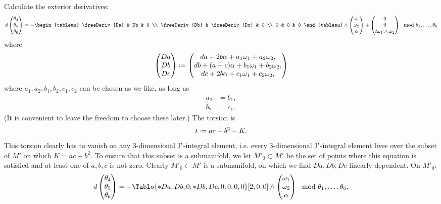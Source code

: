 Calculate the exterior derivatives:
\[
d
\begin{pmatrix}
  \theta_4 \\
  \theta_5 \\
  \theta_6 
\end{pmatrix}
=
-
\begin{tableau}
\freeDeriv{Da} & Db & 0 \\
\freeDeriv{Db} & \freeDeriv{Dc} & 0 \\
0 & 0 & 0
\end{tableau}
\wedge 
\begin{pmatrix}
  \pf_1 \\
  \pf_2 \\
  \alpha
\end{pmatrix}
+
\begin{pmatrix}
0 \\
0 \\
t \pf_1 \wedge \pf_2
\end{pmatrix}
\mod{\theta_1,\dots,\theta_6}
\]
where 
\[
\begin{pmatrix}
Da \\
Db \\
Dc
\end{pmatrix}
\defeq 
\begin{pmatrix}
da + 2b\alpha + a_1 \pf_1 + a_2 \pf_2, \\
db + (a-c)\alpha + b_1 \pf_1 + b_2 \pf_2, \\
dc + 2b \alpha  + c_1 \pf_1 + c_2 \pf_2,
\end{pmatrix}
\]
where \(a_1,a_2,b_1,b_2,c_1,c_2\) can be chosen as we like, as long as
\begin{align*}
a_2 &= b_1, \\
b_2 &= c_1.
\end{align*}
(It is convenient to leave the freedom to choose these later.)
The torsion is
\[
t\defeq ac-b^2-K.
\]
This torsion clearly has to vanish on any \(3\)-dimensional \(\mathcal{I}'\)-integral element, i.e. every \(3\)-dimensional \(\mathcal{I}'\)-integral element lives over the subset of \(M'\) on which 
\(K=ac-b^2\).
To ensure that this subset is a submanifold, we let \(M'_0 \subset M'\) be the set of points where this equation is satisfied and at least one of \(a,b,c\) is not zero.
Clearly  \(M'_0 \subset M'\) is a submanifold, on which we find \(Da, Db, Dc\) linearly dependent.
On \(M'_0\):
\[
d
\begin{pmatrix}
  \theta_4 \\
  \theta_5 \\
  \theta_6 
\end{pmatrix}
=
-
\Tablo{*Da,Db,0;*Db,Dc,0;0,0,0}[2,0,0]
\wedge 
\begin{pmatrix}
  \pf_1 \\
  \pf_2 \\
  \alpha
\end{pmatrix}
\mod{\theta_1,\dots,\theta_6}.
\]
